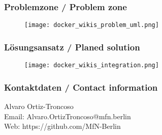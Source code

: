 \documentclass[13pt]{beamer}
\begin{document}
\begin{frame}
  \frametitle{Problemzone / \textcolor{mfn_green}{Problem zone}}
  \begin{figure}
    \texttt{[image: docker\_wikis\_problem\_uml.png]}
  \end{figure}
\end{frame}

\begin{frame}
  \frametitle{Lösungsansatz / \textcolor{mfn_green}{Planed solution}}
  \begin{figure}
    \texttt{[image: docker\_wikis\_integration.png]}
  \end{figure}
\end{frame}

\begin{frame}
  \frametitle{Kontaktdaten / \textcolor{mfn_green}{Contact information}}
  \begin{center}
    Alvaro Ortiz-Troncoso \\
    \medskip
    Email: Alvaro.OrtizTroncoso@mfn.berlin \\    
    \medskip
    Web: https://github.com/MfN-Berlin
  \end{center}
\end{frame}
\end{document}
